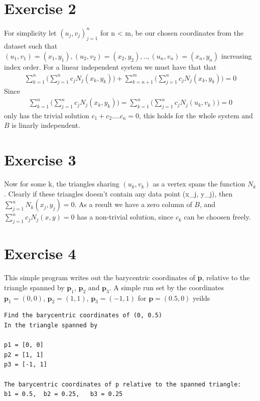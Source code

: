 \documentclass[a4paper,norsk]{article}
\begin{document}
\newpage
\section*{Exercise 2}
For simplicity let  ${(u_j, v_j)}_{j=1}^n$ for n < m, be our chosen coordinates from the dataset such that $(u_1, v_1) = (x_1, y_1), (u_2, v_2) = (x_2, y_2),.., (u_n, v_n) = (x_n, y_n)$ increasing index order. For a linear independent system we must have that that 
\begin{align*}
\sum_{k=1}^n \Big(\sum_{j=1}^n c_j N_j(x_k,y_k) \Big) + \sum_{k=n+1}^m \Big(\sum_{j=1}^n c_j N_j(x_k,y_k) \Big) = 0
\end{align*}
Since
\begin{align*} 
\sum_{k=1}^n \Big(\sum_{j=1}^n c_j N_j(x_k,y_k) \Big)= \sum_{k=1}^n \Big(\sum_{j=1}^n c_j N_j(u_k,v_k) \Big) = 0
\end{align*}
only has the trivial solution $c_1 + c_2 .... c_n  = 0$, this holds for the whole system and $B$ is linarly independent.

\section*{Exercise 3}
Now for some k, the triangles sharing $(u_k, v_k)$ as a vertex spans the function $N_k$. Clearly if these triangles doesn't contain any data point (x_j, y_j), then
$\sum_{j=1}^n N_k(x_j,y_j) = 0$. As a result we have a zero column of $B$, and $\sum_{j=1}^n c_j N_j(x,y) = 0 $ has a non-trivial solution, since $c_k$ can be choosen freely.


\newpage
\section*{Exercise 4}
This simple program writes out the barycentric coordinates of \textbf{p}, relative to the triangle spanned by $\textbf{p}_1$, $\textbf{p}_2$ and $\textbf{p}_3$. 
A simple run set by the coordinates $\textbf{p}_1 = (0, 0)$, $\textbf{p}_2 = (1, 1)$, $\textbf{p}_3 = (-1, 1)$ for $\textbf{p} = (0.5, 0)$ yeilds

\begin{lstlisting}[style=terminal]
Find the barycentric coordinates of (0, 0.5) 
In the triangle spanned by 

p1 = [0, 0]
p2 = [1, 1]
p3 = [-1, 1]

The barycentric coordinates of p relative to the spanned triangle:
b1 = 0.5,  b2 = 0.25,   b3 = 0.25
\end{lstlisting}
\end{document}
